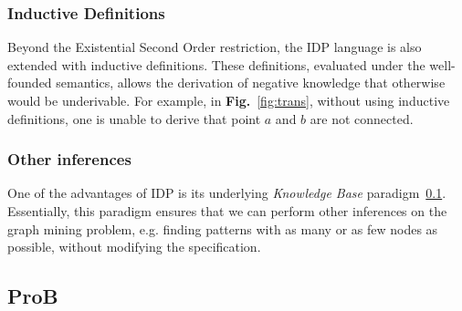 

\subsubsection{Inductive Definitions}
Beyond the Existential Second Order restriction, the IDP language is also extended with inductive definitions. These definitions, evaluated under the well-founded semantics, allows the derivation of negative knowledge that otherwise would be underivable.
For example, in \textbf{Fig.}~\ref{fig:trans}, without using inductive definitions, one is unable to derive that point $a$ and $b$ are not connected.
\begin{figure}[h]
    \centering
\end{figure}

\subsubsection{Other inferences}
One of the advantages of IDP is its underlying \emph{Knowledge Base} paradigm~\ref{}.
Essentially, this paradigm ensures that we can perform other inferences on the graph mining problem, e.g. finding patterns with as many or as few nodes as possible, without modifying the specification.

\reversemarginpar

\subsection{ProB}

